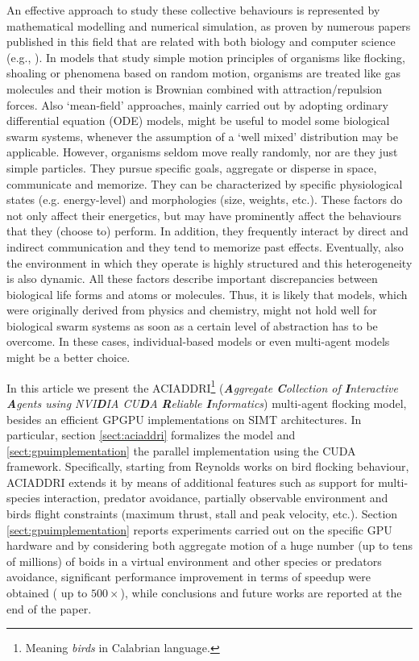 An effective approach to study these collective behaviours is represented by
mathematical modelling and numerical simulation, as proven by numerous papers
published in this field that are related with both biology and computer
science (e.g., \cite{Schmickl:2009}). In models that study simple motion principles of organisms like flocking, shoaling or phenomena based on random motion, organisms are treated like gas molecules and their motion is
Brownian combined with attraction/repulsion forces. Also ‘mean-field’ approaches, mainly carried out by adopting ordinary differential equation (ODE) models, might be useful to model some biological
swarm systems, whenever the assumption of a ‘well mixed’ distribution may be applicable.
However, organisms seldom move really randomly, nor are they just simple particles. They
pursue specific goals, aggregate or disperse in space, communicate and memorize. They can be characterized by specific physiological states (e.g. energy-level) and morphologies (size, weights, etc.).
These factors do not only affect their energetics, but may have prominently affect the behaviours
that they (choose to) perform. In addition, they frequently interact by direct and indirect
communication and they tend to memorize past effects. Eventually, also the environment
in which they operate is highly structured and this heterogeneity is also dynamic.
All these factors describe important discrepancies between biological life forms
and atoms or molecules. Thus, it is likely that models, which were originally derived from physics and chemistry, might not hold well
for biological swarm systems as soon as a certain level of abstraction has to be overcome.
In these cases, individual-based models or even multi-agent
models \cite{Ferber:1999,Woolridge:2001} might be a better choice.

In this article we present the
\textsc{ACIADDRI}\footnote{ Meaning \textit{birds} in Calabrian language.} (\emph{\textbf{A}ggregate \textbf{C}ollection of \textbf{I}nteractive \textbf{A}gents using NVI\textbf{D}IA CU\textbf{D}A \textbf{R}eliable \textbf{I}nformatics}) multi-agent flocking model, besides an efficient GPGPU implementations on SIMT architectures. In particular, section \ref{sect:aciaddri}
formalizes the model and \ref{sect:gpuimplementation} the parallel
implementation using the CUDA framework.
Specifically, starting from Reynolds works \cite{Reynolds:1987}\cite{Reynolds:1999}\cite{Reynolds:2000} on bird flocking behaviour, \textsc{ACIADDRI} extends it by means of
additional features such as support for multi-species interaction, predator
avoidance, partially observable environment and birds flight constraints
(maximum thrust, stall and peak velocity, etc.). Section \ref{sect:gpuimplementation} reports experiments carried out on the
specific GPU hardware and by considering both aggregate motion of a huge number (up to tens of millions) of boids in a virtual
environment and other species or predators avoidance, significant performance
improvement in terms of speedup were obtained ( 
up to $ 500\times$), while
conclusions and future works are reported at the end of the paper.




